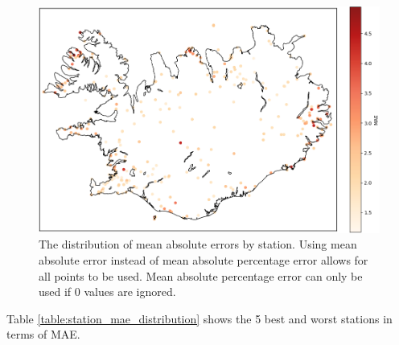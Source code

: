 \begin{figure}
    \includegraphics[scale=0.6]{Figures/MAEoverIceland.png}
    \caption[Distribution of mean absolute errors by station]{The distribution of mean absolute errors by station. Using mean absolute error instead of mean absolute percentage error allows for all points to be used. Mean absolute percentage error can only be used if 0 values are ignored.}
    \label{fig:station_mae_distribution}
\end{figure}

Table \ref{table:station_mae_distribution} shows the 5 best and worst stations in terms of MAE.

\begin{table}[h]
    \caption[Mean absolute difference of measured wind speed and reanalysis wind speed at select stations]{Mean absolute error for reanalysis wind speed as compared to measured wind speed, for the five stations with the highest difference and the five stations with the lowest difference.}
    \label{table:station_mae_distribution}
\end{table}

